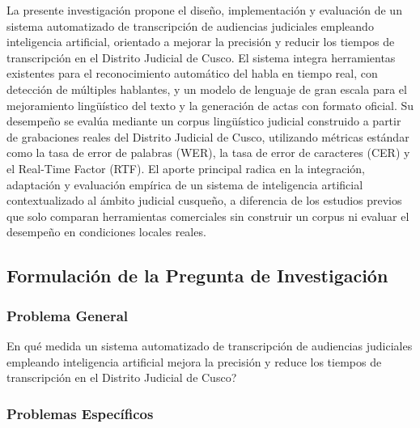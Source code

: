 \documentclass[12pt,a4paper,oneside]{article}
\begin{document}
La presente investigaci\'on propone el dise\~no, implementaci\'on y evaluaci\'on de un sistema automatizado de transcripci\'on de audiencias judiciales empleando inteligencia artificial, orientado a mejorar la precisi\'on y reducir los tiempos de transcripci\'on en el Distrito Judicial de Cusco. El sistema integra herramientas existentes para el reconocimiento autom\'atico del habla en tiempo real, con detecci\'on de m\'ultiples hablantes, y un modelo de lenguaje de gran escala para el mejoramiento ling\"u\'istico del texto y la generaci\'on de actas con formato oficial. Su desempe\~no se eval\'ua mediante un corpus ling\"u\'istico judicial construido a partir de grabaciones reales del Distrito Judicial de Cusco, utilizando m\'etricas est\'andar como la tasa de error de palabras (WER), la tasa de error de caracteres (CER) y el Real-Time Factor (RTF). El aporte principal radica en la integraci\'on, adaptaci\'on y evaluaci\'on emp\'irica de un sistema de inteligencia artificial contextualizado al \'ambito judicial cusque\~no, a diferencia de los estudios previos que solo comparan herramientas comerciales sin construir un corpus ni evaluar el desempe\~no en condiciones locales reales.

\subsection{Formulaci\'on de la Pregunta de Investigaci\'on}

\subsubsection{Problema General}

\textquestiondown En qu\'e medida un sistema automatizado de transcripci\'on de audiencias judiciales empleando inteligencia artificial mejora la precisi\'on y reduce los tiempos de transcripci\'on en el Distrito Judicial de Cusco?

\subsubsection{Problemas Espec\'ificos}
\end{document}
